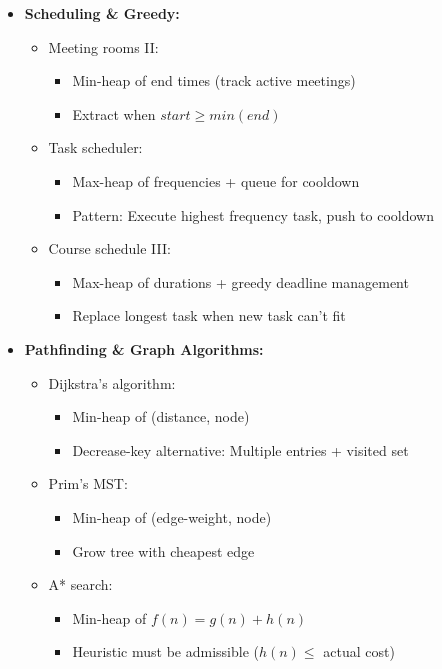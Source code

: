 \documentclass[a4paper,10pt]{book}
\begin{document}
\begin{itemize}
    \item \textbf{Scheduling \& Greedy:}
    \begin{itemize}
        \item Meeting rooms II:
        \begin{itemize}
            \item Min-heap of end times (track active meetings)
            \item Extract when $start \geq min(end)$
        \end{itemize}
        \item Task scheduler:
        \begin{itemize}
            \item Max-heap of frequencies + queue for cooldown
            \item Pattern: Execute highest frequency task, push to cooldown
        \end{itemize}
        \item Course schedule III:
        \begin{itemize}
            \item Max-heap of durations + greedy deadline management
            \item Replace longest task when new task can't fit
        \end{itemize}
    \end{itemize}
    
    \item \textbf{Pathfinding \& Graph Algorithms:}
    \begin{itemize}
        \item Dijkstra's algorithm:
        \begin{itemize}
            \item Min-heap of (distance, node)
            \item Decrease-key alternative: Multiple entries + visited set
        \end{itemize}
        \item Prim's MST:
        \begin{itemize}
            \item Min-heap of (edge-weight, node)
            \item Grow tree with cheapest edge
        \end{itemize}
        \item A* search:
        \begin{itemize}
            \item Min-heap of $f(n) = g(n) + h(n)$
            \item Heuristic must be admissible ($h(n) \leq$ actual cost)
        \end{itemize}
    \end{itemize}
    

\end{itemize}
\end{document}
